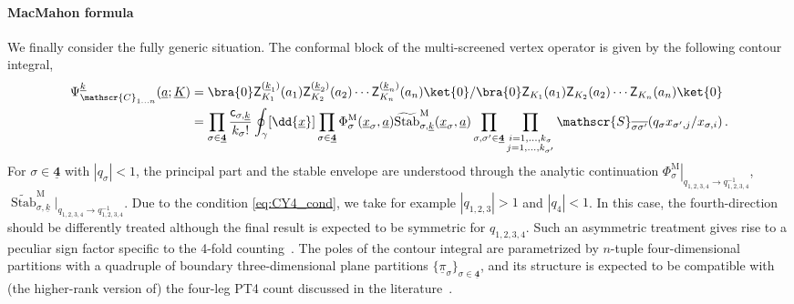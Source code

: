 \paragraph{MacMahon formula}

We finally consider the fully generic situation.
The conformal block of the multi-screened vertex operator is given by the following contour integral,
\begin{align}
    \Psi_{\mathscr{C}_{1\ldots n}}^{\underline{k}}(\underline{a};\underline{K}) & = \bra{0} \mathsf{Z}^{(\underline{k}_1)}_{K_1}(a_1) \mathsf{Z}^{(\underline{k}_2)}_{K_2}(a_2) \cdots \mathsf{Z}^{(\underline{k}_n)}_{K_n}(a_n) \ket{0} / \bra{0} \mathsf{Z}_{K_1}(a_1) \mathsf{Z}_{K_2}(a_2) \cdots \mathsf{Z}_{K_n}(a_n) \ket{0}
    \nonumber \\ 
    & = \prod_{\sigma \in \underline{\mathbf{4}}} \frac{\mathsf{c}_{\sigma,\underline{k}}}{k_\sigma!} \oint_\gamma [\dd{\underline{x}}] \prod_{\sigma \in \underline{\mathbf{4}}} \Phi_{\sigma}^\text{M}(\underline{x}_\sigma,\underline{a}) \widetilde{\operatorname{Stab}}_{\sigma,\underline{k}}^\text{M}(\underline{x}_\sigma,\underline{a}) 
    \prod_{\sigma, \sigma' \in \underline{\mathbf{4}}} \prod_{\substack{i = 1,\ldots,k_\sigma \\ j = 1, \ldots, k_{\sigma'}}} \mathscr{S}_{\overline{\sigma\sigma'}}(q_\sigma x_{\sigma',j}/x_{\sigma,i})
    \, .
    \label{eq:block_M_multi}
\end{align}
For $\sigma \in \underline{\mathbf{4}}$ with $|q_\sigma| < 1$, the principal part and the stable envelope are understood through the analytic continuation $\left.\Phi_{\sigma}^\text{M}\right|_{q_{1,2,3,4} \to q_{1,2,3,4}^{-1}}$, $\widetilde{\operatorname{Stab}}_{\sigma,\underline{k}}^\text{M}|_{q_{1,2,3,4} \to q_{1,2,3,4}^{-1}}$.
Due to the condition \eqref{eq:CY4_cond}, we take for example $|q_{1,2,3}| > 1$ and $|q_4| < 1$.
In this case, the fourth-direction should be differently treated although the final result is expected to be symmetric for $q_{1,2,3,4}$.
Such an asymmetric treatment gives rise to a peculiar sign factor specific to the 4-fold counting~\cite{Nekrasov:2017cih,Nekrasov:2018xsb}.
The poles of the contour integral are parametrized by $n$-tuple four-dimensional partitions with a quadruple of boundary three-dimensional plane partitions $\{\underline{\pi}_\sigma\}_{\sigma \in \underline{\mathbf{4}}}$, and its structure is expected to be compatible with (the higher-rank version of) the four-leg PT4 count discussed in the literature~\cite{Cao:2019tvv,Monavari:2022rtf,Liu2023:PT4,Nekrasov:2023nai}.

